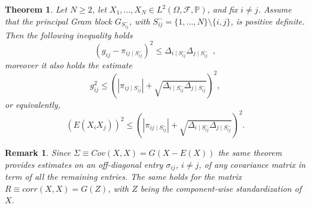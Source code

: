 \documentclass[11pt]{article}
\newtheorem{theorem}{Theorem}
\newtheorem{remark}{Remark}
\begin{document}
\begin{theorem}
Let $N\geq 2$, let $X_1,\dots,X_N\in L^2(\Omega,\mathcal F,\mathbb P)$, and fix $i\neq j$. Assume that the principal Gram block $G_{S^{-}_{ij}}$, with $S^{-}_{ij}=\{1,\dots,N\}\setminus\{i,j\}$, is positive definite. Then the following inequality holds
\begin{equation}\label{residual}
\left(
{g}_{ij}-\pi_{ij\mid S^{-}_{ij}}
\right)^2
\leq
\Delta_{i\mid S^{-}_{ij}}\Delta_{j\mid S^{-}_{ij}}\;\;,
\end{equation}
moreover it also holds the estimate
\begin{equation}\label{N_general}
{g}_{ij}^2
\leq
\left(
|\pi_{ij\mid S^{-}_{ij}}|
+
\sqrt{
\Delta_{i\mid S^{-}_{ij}}\Delta_{j\mid S^{-}_{ij}}
}
\right)^2,
\end{equation}
or equivalently,
\begin{equation}
\left(E(X_iX_j)\right)^2
\leq
\left(
|\pi_{ij\mid S^{-}_{ij}}|
+
\sqrt{
\Delta_{i\mid S^{-}_{ij}}\Delta_{j\mid S^{-}_{ij}}
}
\right)^2.
\end{equation}
\end{theorem}
\begin{remark} Since $\Sigma\equiv Cov(X,X)=G(X-E(X))$ the same theorem provides estimates on an off-diagonal entry $\sigma_{ij}$, $i\neq j$, of any covariance matrix in term of all the remaining entries. The same holds for the matrix $R\equiv corr(X,X)=G(Z)$, with $Z$  being the component-wise standardization of $X$.  
\end{remark}
\end{document}
